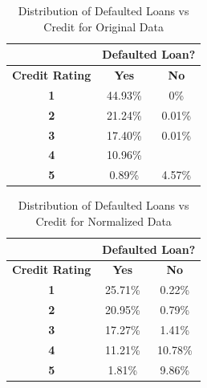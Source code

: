\begin{table}[!htb]
\centering
\caption{Distribution of Defaulted Loans vs Credit for Original Data}
\label{table:dataorg}
\begin{tabular}{@{}ccc@{}}
\toprule
\multicolumn{1}{l}{\textbf{}} & \multicolumn{2}{l}{\textbf{Defaulted Loan?}} \\ \midrule
\textbf{Credit Rating}        & \textbf{Yes}          & \textbf{No}          \\ \midrule
\textbf{1}                    & 44.93\%               & 0\%                  \\ 
\textbf{2}                    & 21.24\%               & 0.01\%               \\ 
\textbf{3}                    & 17.40\%               & 0.01\%               \\ 
\textbf{4}                    & 10.96\%               &                      \\ 
\textbf{5}                    & 0.89\%                & 4.57\%               \\ \bottomrule
\end{tabular}
\end{table}

\begin{table}[]
\centering
\caption{Distribution of Defaulted Loans vs Credit for Normalized Data}
\label{table:datanormalized}
\begin{tabular}{@{}ccc@{}}
\toprule
\multicolumn{1}{l}{\textbf{}} & \multicolumn{2}{l}{\textbf{Defaulted Loan?}} \\ \midrule
\textbf{Credit Rating}        & \textbf{Yes}          & \textbf{No}          \\ \midrule
\textbf{1}                    & 25.71\%               & 0.22\%               \\ 
\textbf{2}                    & 20.95\%               & 0.79\%               \\ 
\textbf{3}                    & 17.27\%               & 1.41\%               \\ 
\textbf{4}                    & 11.21\%               & 10.78\%              \\ 
\textbf{5}                    & 1.81\%                & 9.86\%               \\ \bottomrule
\end{tabular}
\end{table}

